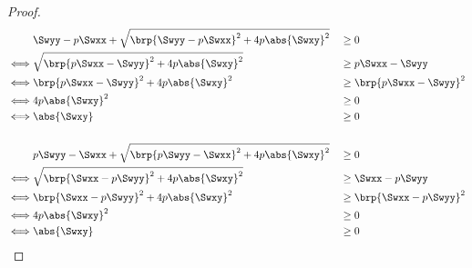 \begin{lemma}
\label{lem:Hs_ineq}
\end{lemma}
\begin{proof}
  \begin{align*}
           &\Swyy-p\Swxx + \sqrt{\brp{\Swyy-p\Swxx }^2 + 4 p \abs{\Swxy}^2} &&\ge 0
    \\\iff &\sqrt{\brp{p\Swxx-\Swyy}^2 + 4 p \abs{\Swxy}^2}                 &&\ge p\Swxx - \Swyy
    \\\iff &      \brp{p\Swxx-\Swyy}^2 + 4 p \abs{\Swxy}^2                  &&\ge \brp{p\Swxx - \Swyy}^2
    \\\iff &                             4 p \abs{\Swxy}^2                  &&\ge 0
    \\\iff &                                 \abs{\Swxy}                    &&\ge 0
    \\
    \\
           & p\Swyy -  \Swxx  + \sqrt{\brp{p\Swyy -  \Swxx}^2 + 4p\abs{\Swxy }^2} &&\ge 0
    \\\iff & \sqrt{\brp{\Swxx -  p\Swyy}^2 + 4p\abs{\Swxy }^2}                    &&\ge \Swxx - p\Swyy
    \\\iff &       \brp{\Swxx -  p\Swyy}^2 + 4p\abs{\Swxy }^2                     &&\ge \brp{\Swxx - p\Swyy}^2
    \\\iff &                                 4p\abs{\Swxy }^2                     &&\ge 0
    \\\iff &                                 \abs{\Swxy}                          &&\ge 0
  \end{align*}
\end{proof}


